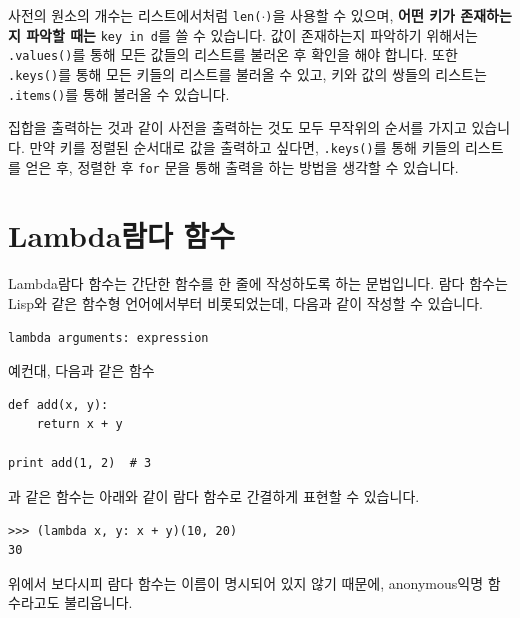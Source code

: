 \documentclass[../main.tex]{subfiles}
\begin{document}
사전의 원소의 개수는 리스트에서처럼 \texttt{len($\cdot$)}을 사용할 수 있으며, \textbf{어떤 키가 존재하는지 파악할 때는} \texttt{key in d}를 쓸 수 있습니다.
값이 존재하는지 파악하기 위해서는 \texttt{.values()}를 통해 모든 값들의 리스트를 불러온 후 확인을 해야 합니다.
또한 \texttt{.keys()}를 통해 모든 키들의 리스트를 불러올 수 있고, 키와 값의 쌍들의 리스트는 \texttt{.items()}를 통해 불러올 수 있습니다.

집합을 출력하는 것과 같이 사전을 출력하는 것도 모두 무작위의 순서를 가지고 있습니다.
만약 키를 정렬된 순서대로 값을 출력하고 싶다면, \texttt{.keys()}를 통해 키들의 리스트를 얻은 후, 정렬한 후 \texttt{for} 문을 통해 출력을 하는 방법을 생각할 수 있습니다.

\section{Lambda람다 함수}
Lambda람다 함수는 간단한 함수를 한 줄에 작성하도록 하는 문법입니다.
람다 함수는 Lisp와 같은 함수형 언어에서부터 비롯되었는데, 다음과 같이 작성할 수 있습니다.
\begin{verbatim}
lambda arguments: expression
\end{verbatim}
예컨대, 다음과 같은 함수
\begin{verbatim}
def add(x, y):
    return x + y

print add(1, 2)  # 3
\end{verbatim}
과 같은 함수는 아래와 같이 람다 함수로 간결하게 표현할 수 있습니다.
\begin{verbatim}
>>> (lambda x, y: x + y)(10, 20)
30
\end{verbatim}
위에서 보다시피 람다 함수는 이름이 명시되어 있지 않기 때문에, anonymous익명 함수라고도 불리웁니다.
\end{document}
